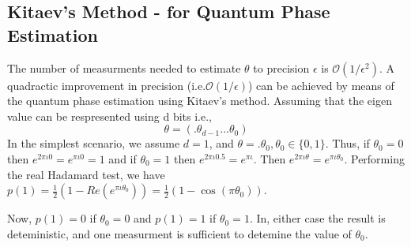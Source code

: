 \documentclass[12pt, oneside]{book}
\theoremstyle{definition}
\theoremstyle{definition}
\theoremstyle{remark}
\begin{document}
\subsection{Kitaev's Method - for Quantum Phase Estimation}
The number of measurments needed to estimate $\theta$ to precision $\epsilon$ is $\mathcal{O}(1/\epsilon^2)$.
A quadractic improvement in precision (i.e.$\mathcal{O}(1/\epsilon)$) can be achieved by means of the quantum phase estimation
using Kitaev's method.
Assuming that the eigen value can be respresented using d bits i.e.,
\[
\theta = (.\theta_{d-1}...\theta_0) 
\]
In the simplest scenario, we assume $d=1$, and $\theta =.\theta_0, \theta_0 \in \{0,1\}$.
Thus, if $\theta_0=0$ then $e^{2\pi\iota 0}=e^{\pi\iota 0}=1$ and if $\theta_0=1$ then $e^{2\pi\iota 0.5}=e^{\pi\iota}$.
Then $e^{2\pi\iota \theta}=e^{\pi\iota \theta_0}$.
Performing the real Hadamard test, we have $p(1)=\frac{1}{2}(1-Re(e^{\pi\iota \theta_0}))=\frac{1}{2}(1-\cos(\pi\theta_0))$.

Now, $p(1)=0$ if $\theta_0=0$ and $p(1)=1$ if $\theta_0=1$. In, either case the result is deteministic, and one measurment is sufficient to detemine the 
value of $\theta_0$.
\end{document}
